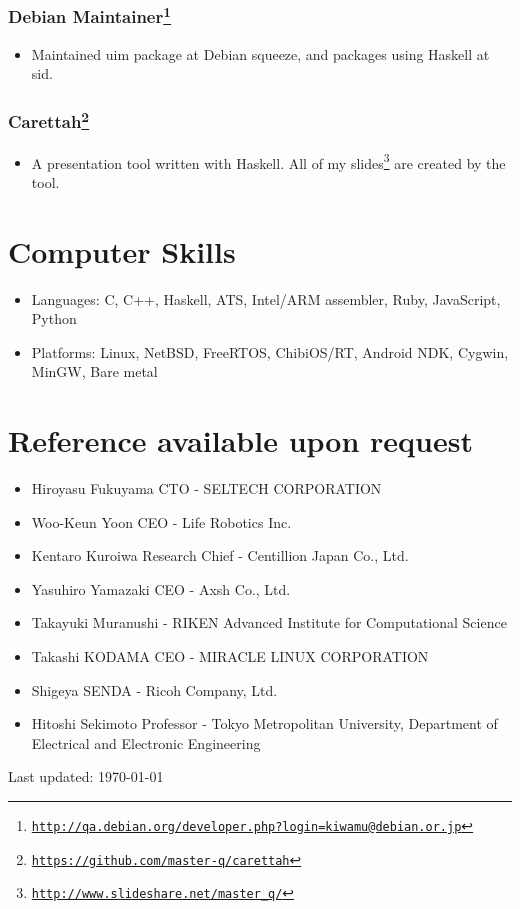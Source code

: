 \documentclass[letterpaper]{article}
\def\footer{
  \begin{center}
    \begin{footnotesize}
      Last updated: \today
    \end{footnotesize}
  \end{center}
}
\begin{document}
\subsubsection*{Debian Maintainer\footnote{\href{http://qa.debian.org/developer.php?login=kiwamu@debian.or.jp}{\tt http://qa.debian.org/developer.php?login=kiwamu@debian.or.jp}}}
\begin{itemize}
\item Maintained uim package at Debian squeeze, and packages using Haskell at sid.
\end{itemize}

\subsubsection*{Carettah\footnote{\href{https://github.com/master-q/carettah}{\tt https://github.com/master-q/carettah}}}
\begin{itemize}
\item A presentation tool written with Haskell. All of my slides\footnote{\href{http://www.slideshare.net/master\_q/}{\tt http://www.slideshare.net/master\_q/}} are created by the tool.
\end{itemize}

\section*{Computer Skills}

\begin{itemize}
  \item Languages: C, C++, Haskell, ATS, Intel/ARM assembler, Ruby, JavaScript, Python
  \item Platforms: Linux, NetBSD, FreeRTOS, ChibiOS/RT, Android NDK, Cygwin, MinGW, Bare metal
\end{itemize}

\section*{Reference available upon request}

\begin{itemize}
  \item Hiroyasu Fukuyama CTO - SELTECH CORPORATION
  \item Woo-Keun Yoon CEO - Life Robotics Inc.
  \item Kentaro Kuroiwa Research Chief - Centillion Japan Co., Ltd.
  \item Yasuhiro Yamazaki CEO - Axsh Co., Ltd.
  \item Takayuki Muranushi - RIKEN Advanced Institute for Computational Science
  \item Takashi KODAMA CEO - MIRACLE LINUX CORPORATION
  \item Shigeya SENDA - Ricoh Company, Ltd.
  \item Hitoshi Sekimoto Professor - Tokyo Metropolitan University, Department of Electrical and Electronic Engineering
\end{itemize}

\bigskip
\footer
\end{document}
